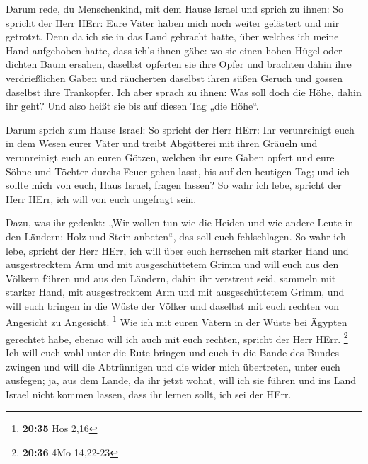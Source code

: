  Darum rede, du Menschenkind, mit dem Hause Israel und
sprich zu ihnen: So spricht der Herr HErr: Eure Väter haben mich noch
weiter gelästert und mir getrotzt.  Denn da ich sie in das
Land gebracht hatte, über welches ich meine Hand aufgehoben hatte, dass
ich's ihnen gäbe: wo sie einen hohen Hügel oder dichten Baum ersahen,
daselbst opferten sie ihre Opfer und brachten dahin ihre verdrießlichen
Gaben und räucherten daselbst ihren süßen Geruch und gossen daselbst
ihre Trankopfer.  Ich aber sprach zu ihnen: Was soll doch
die Höhe, dahin ihr geht? Und also heißt sie bis auf diesen Tag „die
Höhe``.

 Darum sprich zum Hause Israel: So spricht der Herr HErr:
Ihr verunreinigt euch in dem Wesen eurer Väter und treibt Abgötterei mit
ihren Gräueln  und verunreinigt euch an euren Götzen,
welchen ihr eure Gaben opfert und eure Söhne und Töchter durchs Feuer
gehen lasst, bis auf den heutigen Tag; und ich sollte mich von euch,
Haus Israel, fragen lassen? So wahr ich lebe, spricht der Herr HErr, ich
will von euch ungefragt sein.

 Dazu, was ihr gedenkt: „Wir wollen tun wie die Heiden und
wie andere Leute in den Ländern: Holz und Stein anbeten``, das soll euch
fehlschlagen.  So wahr ich lebe, spricht der Herr HErr, ich
will über euch herrschen mit starker Hand und ausgestrecktem Arm und mit
ausgeschüttetem Grimm  und will euch aus den Völkern führen
und aus den Ländern, dahin ihr verstreut seid, sammeln mit starker Hand,
mit ausgestrecktem Arm und mit ausgeschüttetem Grimm,  und
will euch bringen in die Wüste der Völker und daselbst mit euch rechten
von Angesicht zu Angesicht. \footnote{\textbf{20:35} Hos 2,16}
 Wie ich mit euren Vätern in der Wüste bei Ägypten
gerechtet habe, ebenso will ich auch mit euch rechten, spricht der Herr
HErr. \footnote{\textbf{20:36} 4Mo 14,22-23}  Ich will euch
wohl unter die Rute bringen und euch in die Bande des Bundes zwingen
 und will die Abtrünnigen und die wider mich übertreten,
unter euch ausfegen; ja, aus dem Lande, da ihr jetzt wohnt, will ich sie
führen und ins Land Israel nicht kommen lassen, dass ihr lernen sollt,
ich sei der HErr.

